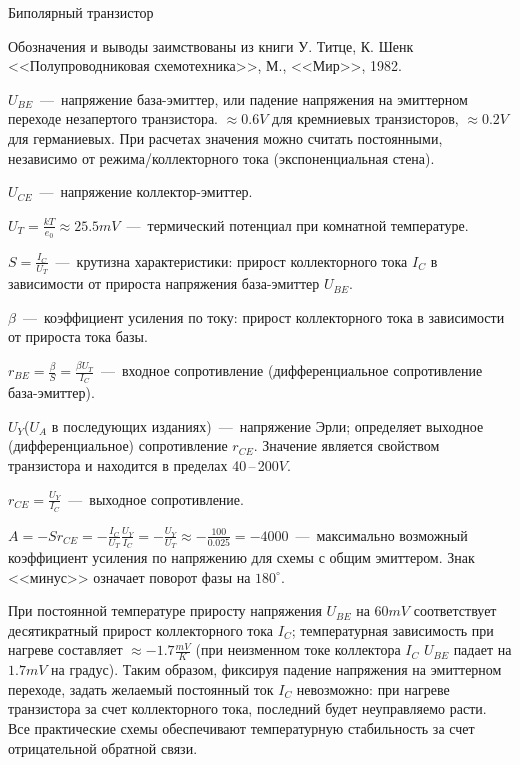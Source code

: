 \documentclass[
a4paper
,11pt
,landscape
,russian
,twocolumn
]{letter}
\newcommand\vsp{\vspace{.2in}}
\begin{document}
\thispagestyle{empty}

\begin{Large}
	Биполярный транзистор
\end{Large}

Обозначения и выводы заимствованы из книги У. Титце, К. Шенк
<<Полупроводниковая схемотехника>>, М., <<Мир>>, 1982.

$U_{BE}$~---~напряжение база-эмиттер, или падение напряжения на
эмиттерном переходе незапертого транзистора. $\approx 0.6V$ для
кремниевых транзисторов, $\approx 0.2V$ для германиевых. При расчетах
значения можно считать постоянными, независимо от режима/коллекторного
тока (экспоненциальная стена).

$U_{CE}$~---~напряжение коллектор-эмиттер.

$U_T=\frac{kT}{e_0}\approx 25.5mV$~---~термический потенциал при
комнатной температуре.

$S=\frac{I_C}{U_T}$~---~крутизна характеристики: прирост коллекторного
тока $I_C$ в зависимости от прироста напряжения база-эмиттер $U_{BE}$.

$\beta$~---~коэффициент усиления по току: прирост
коллекторного тока в зависимости от прироста тока базы.

$r_{BE}=\frac{\beta}{S}=\frac{\beta U_T}{I_C}$~---~входное сопротивление
(дифференциальное сопротивление база-эмиттер).

$U_Y$($U_A$ в последующих изданиях)~---~напряжение Эрли; определяет
выходное (дифференциальное) сопротивление $r_{CE}$. Значение является
свойством транзистора и находится в пределах 40\,--\,200$V$.

$r_{CE}=\frac{U_Y}{I_C}$~---~выходное сопротивление.

$A=-Sr_{CE}=-\frac{I_C}{U_T}\frac{U_Y}{I_C}=-\frac{U_Y}{U_T}
	\approx-\frac{100}{0.025}=-4000$~---~максимально возможный
коэффициент усиления по напряжению для схемы с общим эмиттером.
Знак <<минус>> означает поворот фазы на $180^{\circ}$.

\vsp

При постоянной температуре приросту напряжения $U_{BE}$ на $60mV$
соответствует десятикратный прирост коллекторного тока $I_C$;
температурная зависимость при нагреве составляет
$\approx -1.7\frac{mV}{K}$
(при неизменном токе коллектора $I_C$ $U_{BE}$ падает на
$1.7mV$ на градус). Таким образом, фиксируя падение напряжения на
эмиттерном переходе, задать желаемый постоянный ток $I_C$
невозможно: при нагреве транзистора за счет коллекторного
тока, последний будет неуправляемо расти. Все практические
схемы обеспечивают температурную стабильность за счет
отрицательной обратной связи.
\end{document}
